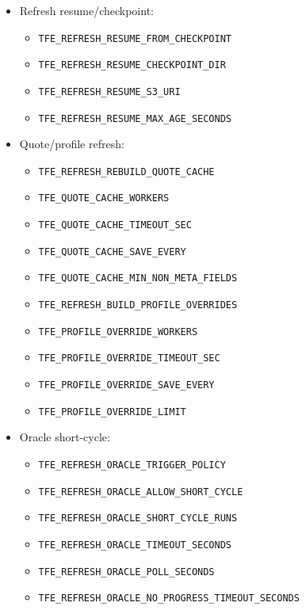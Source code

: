 \documentclass[
]{article}
\providecommand{\tightlist}{%
  \setlength{\itemsep}{0pt}\setlength{\parskip}{0pt}}
\begin{document}
\begin{itemize}
\tightlist
\item
  Refresh resume/checkpoint:

  \begin{itemize}
  \tightlist
  \item
    \texttt{TFE\_REFRESH\_RESUME\_FROM\_CHECKPOINT}
  \item
    \texttt{TFE\_REFRESH\_RESUME\_CHECKPOINT\_DIR}
  \item
    \texttt{TFE\_REFRESH\_RESUME\_S3\_URI}
  \item
    \texttt{TFE\_REFRESH\_RESUME\_MAX\_AGE\_SECONDS}
  \end{itemize}
\item
  Quote/profile refresh:

  \begin{itemize}
  \tightlist
  \item
    \texttt{TFE\_REFRESH\_REBUILD\_QUOTE\_CACHE}
  \item
    \texttt{TFE\_QUOTE\_CACHE\_WORKERS}
  \item
    \texttt{TFE\_QUOTE\_CACHE\_TIMEOUT\_SEC}
  \item
    \texttt{TFE\_QUOTE\_CACHE\_SAVE\_EVERY}
  \item
    \texttt{TFE\_QUOTE\_CACHE\_MIN\_NON\_META\_FIELDS}
  \item
    \texttt{TFE\_REFRESH\_BUILD\_PROFILE\_OVERRIDES}
  \item
    \texttt{TFE\_PROFILE\_OVERRIDE\_WORKERS}
  \item
    \texttt{TFE\_PROFILE\_OVERRIDE\_TIMEOUT\_SEC}
  \item
    \texttt{TFE\_PROFILE\_OVERRIDE\_SAVE\_EVERY}
  \item
    \texttt{TFE\_PROFILE\_OVERRIDE\_LIMIT}
  \end{itemize}
\item
  Oracle short-cycle:

  \begin{itemize}
  \tightlist
  \item
    \texttt{TFE\_REFRESH\_ORACLE\_TRIGGER\_POLICY}
  \item
    \texttt{TFE\_REFRESH\_ORACLE\_ALLOW\_SHORT\_CYCLE}
  \item
    \texttt{TFE\_REFRESH\_ORACLE\_SHORT\_CYCLE\_RUNS}
  \item
    \texttt{TFE\_REFRESH\_ORACLE\_TIMEOUT\_SECONDS}
  \item
    \texttt{TFE\_REFRESH\_ORACLE\_POLL\_SECONDS}
  \item
    \texttt{TFE\_REFRESH\_ORACLE\_NO\_PROGRESS\_TIMEOUT\_SECONDS}
  \end{itemize}
\end{itemize}
\end{document}

